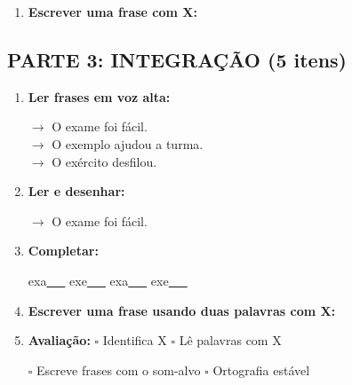 \begin{exercicio}
\begin{enumerate}[resume]
  \item \textbf{Escrever uma frase com X:}
  \begin{center}
  \underline{\hspace{12cm}}
  \end{center}

\end{enumerate}

\subsection*{PARTE 3: INTEGRAÇÃO (5 itens)}

\begin{enumerate}[resume]

  \item \textbf{Ler frases em voz alta:}
  \begin{center}
  $\rightarrow$ O exame foi fácil.\\
  $\rightarrow$ O exemplo ajudou a turma.\\
  $\rightarrow$ O exército desfilou.\\
  \end{center}

  \item \textbf{Ler e desenhar:}
  \begin{center}
  $\rightarrow$ O exame foi fácil.
  \end{center}
  \begin{center}
  \end{center}

  \item \textbf{Completar:}
  \begin{center}
  exa\underline{~~~} \quad exe\underline{~~~} \quad exa\underline{~~~} \quad exe\underline{~~~}
  \end{center}

  \item \textbf{Escrever uma frase usando duas palavras com X:}
  \begin{center}
  \underline{\hspace{12cm}}
  \end{center}

  \item \textbf{Avaliação:} $\square$ Identifica X \quad $\square$ Lê palavras com X
  \begin{center}
  $\square$ Escreve frases com o som-alvo \quad $\square$ Ortografia estável
  \end{center}


\end{enumerate}
\end{exercicio}
